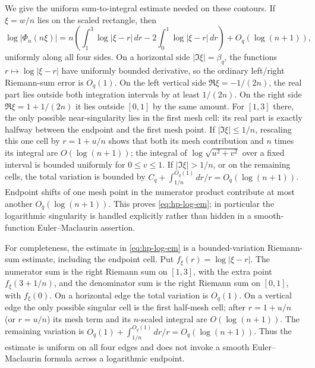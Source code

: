 We give the uniform sum-to-integral estimate needed on these contours.
If $\xi=w/n$ lies on the scaled rectangle, then
\begin{equation}\label{eq:hp-log-em}
 \log|\Phi_n(n\xi)|=n\left(
 \int_1^3\log|\xi-r|\,dr-2\int_0^1\log|\xi-r|\,dr\right)
 +O_q(\log(n+1)),
\end{equation}
uniformly along all four sides.  On a horizontal side $|\Im\xi|=\beta_q$,
the functions $r\mapsto\log|\xi-r|$ have uniformly bounded derivative, so
the ordinary left/right Riemann-sum error is $O_q(1)$.  On the left
vertical side $\Re\xi=-1/(2n)$, the real part lies outside both integration
intervals by at least $1/(2n)$.  On the right side
$\Re\xi=1+1/(2n)$ it lies outside $[0,1]$ by the same amount.  For $[1,3]$
there, the only possible near-singularity lies in the first mesh cell:
its real part is exactly halfway between the endpoint and the first mesh
point.  If $|\Im\xi|\le1/n$, rescaling this one cell by $r=1+u/n$ shows
that both its mesh contribution and $n$ times its integral are
$O(\log(n+1))$; the integral of $\log\sqrt{u^2+v^2}$ over a fixed
interval is bounded uniformly for $0\le v\le1$.  If
$|\Im\xi|>1/n$, or on the remaining cells, the total variation is bounded
by $C_q+\int_{1/n}^{O_q(1)}dr/r=O_q(\log(n+1))$.  Endpoint shifts of one
mesh point in the numerator product contribute at most another
$O_q(\log(n+1))$.  This proves \eqref{eq:hp-log-em}; in particular the
logarithmic singularity is handled explicitly rather than hidden in a
smooth-function Euler--Maclaurin assertion.

For completeness, the estimate in \eqref{eq:hp-log-em} is a bounded-variation
Riemann-sum estimate, including the endpoint cell.  Put
$f_\xi(r)=\log|\xi-r|$.  The numerator sum is the right Riemann sum on
$[1,3]$, with the extra point $f_\xi(3+1/n)$, and the denominator sum is the
right Riemann sum on $[0,1]$, with $f_\xi(0)$.  On a horizontal edge the
total variation is $O_q(1)$.  On a vertical edge the only possible singular
cell is the first half-mesh cell; after $r=1+u/n$ (or $r=u/n$) its mesh term
and its $n$-scaled integral are $O(\log(n+1))$.  The remaining variation is
$O_q(1)+\int_{1/n}^{O_q(1)}dr/r=O_q(\log(n+1))$.  Thus the estimate is
uniform on all four edges and does not invoke a smooth Euler--Maclaurin
formula across a logarithmic endpoint.

